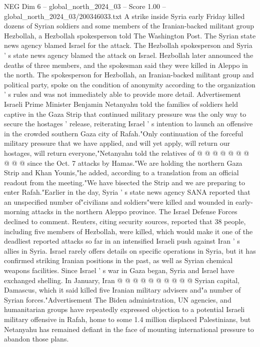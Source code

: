 \begin{textsample}{NEG Dim 6 – global\_north\_2024\_03 – Score 1.00 – global\_north\_2024\_03/200346033.txt}  \label{ex:f6_neg_398}
A strike inside Syria early Friday killed dozens of Syrian soldiers and some members of the Iranian-backed militant group Hezbollah, a Hezbollah spokesperson told The Washington Post.
The Syrian state news agency blamed Israel for the attack.
The Hezbollah spokesperson and Syria ' s state news agency blamed the attack on Israel.
Hezbollah later announced the deaths of three members, and the spokesman said they were killed in Aleppo in the north.
The spokesperson for Hezbollah, an Iranian-backed militant group and political party, spoke on the condition of anonymity according to the organization ' s rules and was not immediately able to provide more detail.
Advertisement Israeli Prime Minister Benjamin Netanyahu told the families of soldiers held captive in the Gaza Strip that continued military pressure was the only way to secure the hostages ' release, reiterating Israel ' s intention to launch an offensive in the crowded southern Gaza city of Rafah."Only continuation of the forceful military pressure that we have applied, and will yet apply, will return our hostages, will return everyone,"Netanyahu told the relatives of @ @ @ @ @ @ @ @ @ @ since the Oct. 7 attacks by Hamas."We are holding the northern Gaza Strip and Khan Younis,"he added, according to a translation from an official readout from the meeting."We have bisected the Strip and we are preparing to enter Rafah."Earlier in the day, Syria ' s state news agency SANA reported that an unspecified number of"civilians and soldiers"were killed and wounded in early-morning attacks in the northern Aleppo province.
The Israel Defense Forces declined to comment.
Reuters, citing security sources, reported that 38 people, including five members of Hezbollah, were killed, which would make it one of the deadliest reported attacks so far in an intensified Israeli push against Iran ' s allies in Syria.
Israel rarely offers details on specific operations in Syria, but it has confirmed striking Iranian positions in the past, as well as Syrian chemical weapons facilities.
Since Israel ' s war in Gaza began, Syria and Israel have exchanged shelling.
In January, Iran @ @ @ @ @ @ @ @ @ @ Syrian capital, Damascus, which it said killed five Iranian military advisers and"a number of Syrian forces."Advertisement The Biden administration, UN agencies, and humanitarian groups have repeatedly expressed objection to a potential Israeli military offensive in Rafah, home to some 1.4 million displaced Palestinians, but Netanyahu has remained defiant in the face of mounting international pressure to abandon those plans.

\end{textsample}
